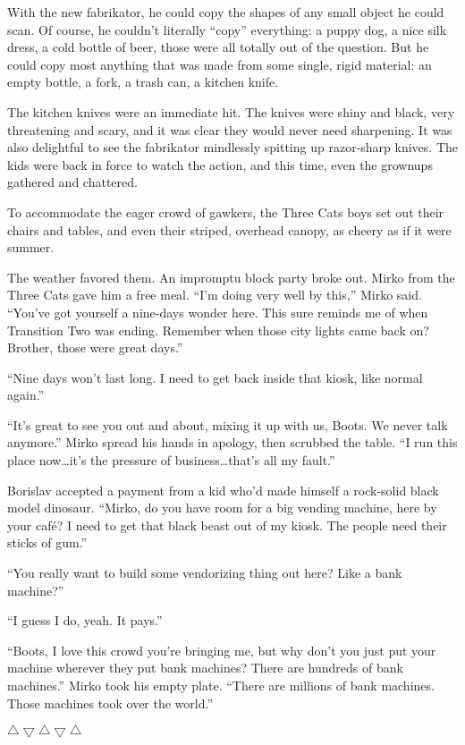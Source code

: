 \documentclass[20 pt,twoside,extrafontsizes,final]{memoir}
\begin{document}
With the new fabrikator, he could copy the shapes of any small object he could scan. Of course, he couldn't literally ``copy'' everything: a puppy dog, a nice silk dress, a cold bottle of beer, those were all totally out of the question. But he could copy most anything that was made from some single, rigid material: an empty bottle, a fork, a trash can, a kitchen knife.

The kitchen knives were an immediate hit. The knives were shiny and black, very threatening and scary, and it was clear they would never need sharpening. It was also delightful to see the fabrikator mindlessly spitting up razor-sharp knives. The kids were back in force to watch the action, and this time, even the grownups gathered and chattered.

To accommodate the eager crowd of gawkers, the Three Cats boys set out their chairs and tables, and even their striped, overhead canopy, as cheery as if it were summer.

The weather favored them. An impromptu block party broke out. Mirko from the Three Cats gave him a free meal. ``I'm doing very well by this,'' Mirko said. ``You've got yourself a nine-days wonder here. This sure reminds me of when Transition Two was ending. Remember when those city lights came back on? Brother, those were great days.''

``Nine days won't last long. I need to get back inside that kiosk, like normal again.''

``It's great to see you out and about, mixing it up with us, Boots. We never talk anymore.'' Mirko spread his hands in apology, then scrubbed the table. ``I run this place now\dots it's the pressure of business\dots that's all my fault.''

Borislav accepted a payment from a kid who'd made himself a rock-solid black model dinosaur.
``Mirko, do you have room for a big vending machine, here by your caf\'e? I need to get that black beast out of my kiosk. The people need their sticks of gum.''

``You really want to build some vendorizing thing out here? Like a bank machine?''

``I guess I do, yeah. It pays.''

``Boots, I love this crowd you're bringing me, but why don't you just put your machine wherever they put bank machines? There are hundreds of bank machines.'' Mirko took his empty plate. ``There are millions of bank machines. Those machines took over the world.''

\vfil 
\centerline{{$\bigtriangleup\bigtriangledown\bigtriangleup\bigtriangledown\bigtriangleup$}}
\end{document}
